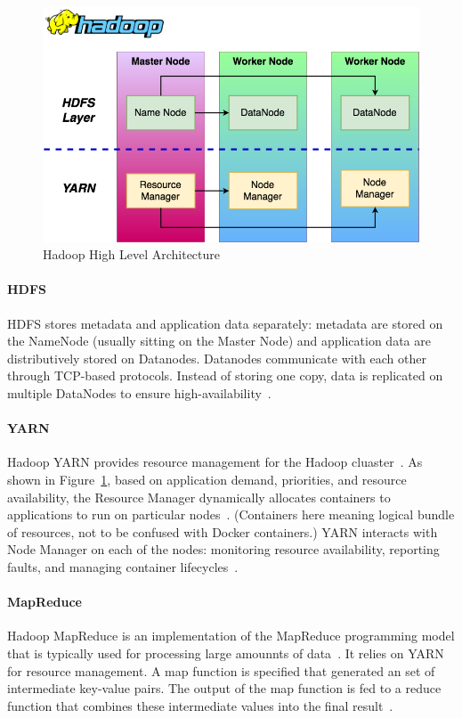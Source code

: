 \begin{figure}[!ht]
	\centering\includegraphics[width=\columnwidth]{images/hadoop.png}
	 \caption{Hadoop High Level 
	 Architecture~\cite{hid-sp18-405-hadoop-wiki}}\label{f:hadoop-high}
\end{figure}

\paragraph{HDFS} HDFS stores metadata and 
application data separately: metadata are stored on the NameNode
(usually sitting on the Master Node) and application data are
distributively stored on Datanodes. Datanodes communicate with each
other through TCP-based protocols. Instead of storing one copy, data
is replicated on multiple DataNodes to ensure
high-availability~\cite{hid-sp18-405-shvachko2010hdfs}.

\paragraph{YARN} Hadoop YARN provides resource management for the 
Hadoop cluaster~\cite{hid-sp18-405-hadoop-official}. As shown in
Figure~\ref{f:hadoop-high}, based on application demand, priorities,
and resource availability, the Resource Manager dynamically allocates
containers to applications to run on particular
nodes~\cite{hid-sp18-405-vavi2013yarn}. (Containers here meaning
logical bundle of resources, not to be confused with Docker
containers.) YARN interacts with Node Manager on each of the nodes:
monitoring resource availability, reporting faults, and managing
container lifecycles~\cite{hid-sp18-405-vavi2013yarn}.

\paragraph{MapReduce} Hadoop MapReduce is an implementation of the 
MapReduce programming model that is typically used for processing
large amounnts of data~\cite{hid-sp18-405-hadoop-official}. It relies
on YARN for resource management. A map function is specified that
generated an set of intermediate key-value pairs. The output of the
map function is fed to a reduce function that combines these
intermediate values into the final
result~\cite{hid-sp18-405-dean2008mapreduce}.

